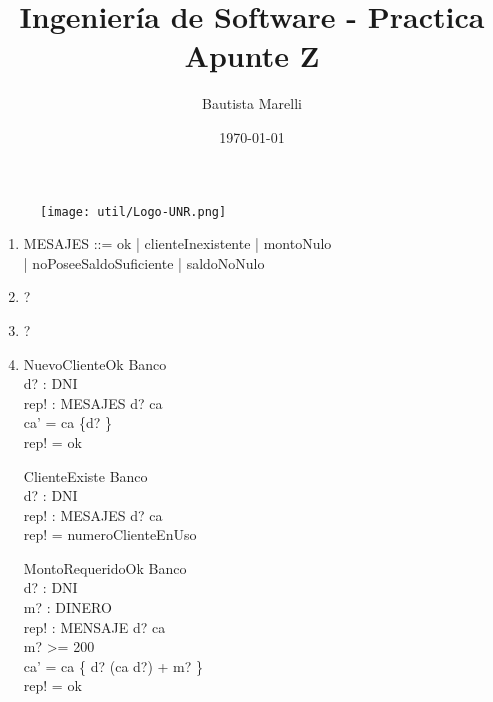 \documentclass{article}
\begin{document}
\begin{figure}
\centering
\texttt{[image: util/Logo-UNR.png]}
\end{figure}

\title{Ingeniería de Software - Practica Apunte Z}
\author{Bautista Marelli
}
\date{\today}

\maketitle
\newpage

\begin{enumerate}
  \item 
    \begin{zed}
      MESAJES ::= ok | clienteInexistente | montoNulo \\
                | noPoseeSaldoSuficiente | saldoNoNulo 
    \end{zed}
  \item ?
  \item ?
  \item 
    \begin{schema}{NuevoClienteOk}
      \Delta Banco \\
      d? : DNI \\
      rep! : MESAJES
      \where
      d? \notin \dom ca \\
      ca' = ca \cup \{d? \} \\
      rep! = ok
    \end{schema}

    \begin{schema}{ClienteExiste}
      \Xi Banco \\
      d? : DNI \\
      rep! : MESAJES
      \where
      d? \in \dom ca \\
      rep! = numeroClienteEnUso
    \end{schema}

    \begin{schema}{MontoRequeridoOk}
      \Delta Banco \\
      d? : DNI \\
      m? : DINERO \\
      rep! : MENSAJE
      \where
      d? \in \dom ca \\
      m? >= 200 \\
      ca' = ca \oplus \{ d? \mapsto (ca \; d?) + m? \} \\
      rep! = ok
    \end{schema}
    

\end{enumerate}
\end{document}
